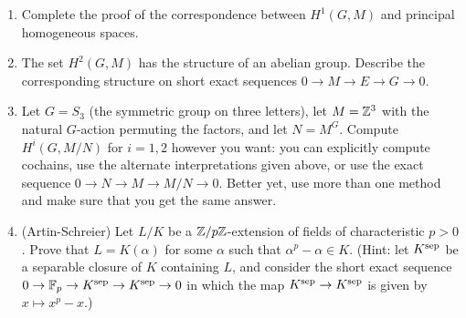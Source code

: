 
\begin{enumerate}
\item
Complete the proof of the correspondence between $H^1(G,M)$ and principal homogeneous spaces.
\item
The set $H^2(G,M)$ has the structure of an abelian group. Describe the
corresponding structure on short exact sequences $0 \to M \to E \to G \to 0$.
\item
Let $G = S_3$ (the symmetric group on three letters), let $M = \mathbb{Z}^3$
with the natural $G$-action permuting the factors, and let $N = M^G$.
Compute $H^i(G, M/N)$ for $i=1,2$ however you want: you can explicitly
compute cochains, use the alternate interpretations given above,
or use the exact sequence $0 \to N \to M \to M/N \to 0$. Better yet, use
more than one method and make sure that you get the same answer.
\item
(Artin-Schreier)
Let $L/K$ be a $\mathbb{Z}/p\mathbb{Z}$-extension of fields of characteristic $p>0$.
Prove that $L = K(\alpha)$ for some $\alpha$ such that
$\alpha^p - \alpha \in K$. (Hint: let $K^{\operatorname{sep}}$ be a separable closure of $K$ containing $L$, and consider the short exact sequence
$0 \to \mathbb{F}_p \to K^{\operatorname{sep}} \to K^{\operatorname{sep}} \to 0$ in which the map $K^{\operatorname{sep}} \to K^{\operatorname{sep}}$
is given by $x \mapsto x^p - x$.)
\end{enumerate}

%


